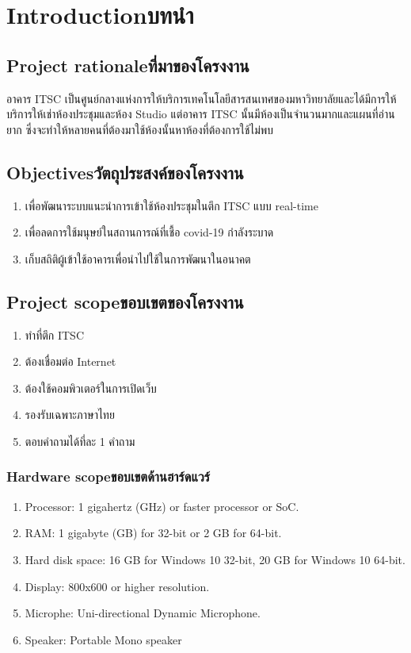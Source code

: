 \chapter{\ifenglish Introduction\else บทนำ\fi}

\section{\ifenglish Project rationale\else ที่มาของโครงงาน\fi}
อาคาร ITSC เป็นศูนย์กลางแห่งการให้บริการเทคโนโลยีสารสนเทศของมหาวิทยาลัยและได้มีการให้บริการให้เช่าห้องประชุมและห้อง
Studio แต่อาคาร ITSC นั้นมีห้องเป็นจำนวนมากและแผนที่อ่านยาก ซึ่งจะทำให้หลายคนที่ต้องมาใช้ห้องนั้นหาห้องที่ต้องการใช้ไม่พบ

\section{\ifenglish Objectives\else วัตถุประสงค์ของโครงงาน\fi}
\begin{enumerate}
    \item เพื่อพัฒนาระบบแนะนำการเข้าใช้ห้องประชุมในตึก ITSC แบบ real-time
    \item เพื่อลดการใช้มนุษย์ในสถานการณ์ที่เชื้อ covid-19 กำลังระบาด
    \item เก็บสถิติผู้เข้าใช้อาคารเพื่อนำไปใช้ในการพัฒนาในอนาคต
\end{enumerate}

\section{\ifenglish Project scope\else ขอบเขตของโครงงาน\fi}
\begin{enumerate}
    \item ทำที่ตึก ITSC
    \item ต้องเชื่อมต่อ Internet
    \item ต้องใช้คอมพิวเตอร์ในการเปิดเว็บ
    \item รองรับเฉพาะภาษาไทย
    \item ตอบคำถามได้ที่ละ 1 คำถาม
\end{enumerate}

\subsection{\ifenglish Hardware scope\else ขอบเขตด้านฮาร์ดแวร์\fi}
\begin{enumerate}
    \item Processor: 1 gigahertz (GHz) or faster processor or SoC.
    \item RAM: 1 gigabyte (GB) for 32-bit or 2 GB for 64-bit.
    \item Hard disk space: 16 GB for Windows 10 32-bit, 20 GB for Windows 10 64-bit.
    \item Display: 800x600 or higher resolution.
    \item Microphe: Uni-directional Dynamic Microphone.
    \item Speaker: Portable Mono speaker 
\end{enumerate}

